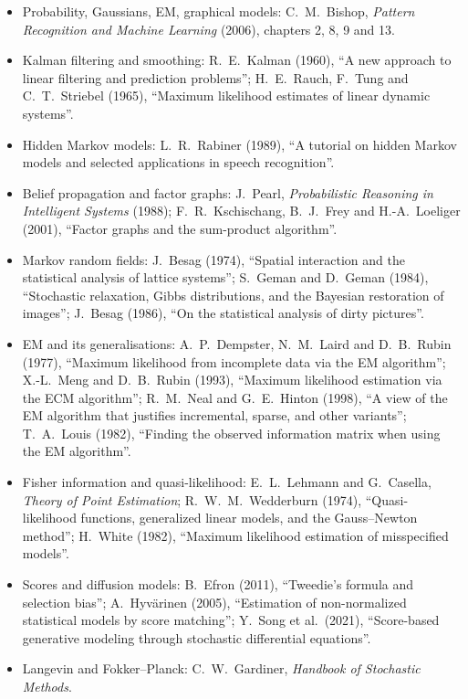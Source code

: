 \begin{itemize}\small
\item Probability, Gaussians, EM, graphical models: C.~M.~Bishop, \emph{Pattern Recognition and Machine Learning} (2006),
  chapters 2, 8, 9 and 13.
\item Kalman filtering and smoothing: R.~E.~Kalman (1960), ``A new approach to linear filtering and prediction problems'';
  H.~E.~Rauch, F.~Tung and C.~T.~Striebel (1965), ``Maximum likelihood estimates of linear dynamic systems''.
\item Hidden Markov models: L.~R.~Rabiner (1989), ``A tutorial on hidden Markov models and selected applications in speech
  recognition''.
\item Belief propagation and factor graphs: J.~Pearl, \emph{Probabilistic Reasoning in Intelligent Systems} (1988);
  F.~R.~Kschischang, B.~J.~Frey and H.-A.~Loeliger (2001), ``Factor graphs and the sum-product algorithm''.
\item Markov random fields: J.~Besag (1974), ``Spatial interaction and the statistical analysis of lattice systems'';
  S.~Geman and D.~Geman (1984), ``Stochastic relaxation, Gibbs distributions, and the Bayesian restoration of images'';
  J.~Besag (1986), ``On the statistical analysis of dirty pictures''.
\item EM and its generalisations: A.~P.~Dempster, N.~M.~Laird and D.~B.~Rubin (1977), ``Maximum likelihood from incomplete
  data via the EM algorithm''; X.-L.~Meng and D.~B.~Rubin (1993), ``Maximum likelihood estimation via the ECM algorithm'';
  R.~M.~Neal and G.~E.~Hinton (1998), ``A view of the EM algorithm that justifies incremental, sparse, and other variants'';
  T.~A.~Louis (1982), ``Finding the observed information matrix when using the EM algorithm''.
\item Fisher information and quasi-likelihood: E.~L.~Lehmann and G.~Casella, \emph{Theory of Point Estimation};
  R.~W.~M.~Wedderburn (1974), ``Quasi-likelihood functions, generalized linear models, and the Gauss--Newton method'';
  H.~White (1982), ``Maximum likelihood estimation of misspecified models''.
\item Scores and diffusion models: B.~Efron (2011), ``Tweedie's formula and selection bias''; A.~Hyv\"arinen (2005),
  ``Estimation of non-normalized statistical models by score matching''; Y.~Song et al.\ (2021), ``Score-based generative
  modeling through stochastic differential equations''.
\item Langevin and Fokker--Planck: C.~W.~Gardiner, \emph{Handbook of Stochastic Methods}.

\end{itemize}
